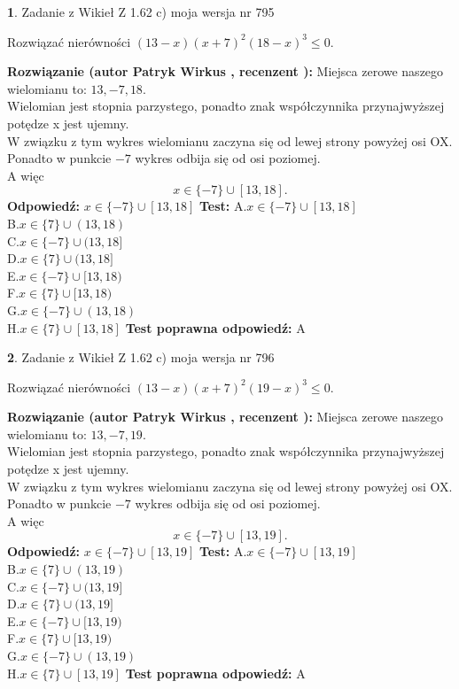 \documentclass[12pt, a4paper]{article}
\theoremstyle{definition} %
\newtheorem{zad}{}
\newcommand{\zadStart}[1]{\begin{zad}#1\newline}
\newcommand{\zadStop}{\end{zad}}
\newcommand{\rozwStart}[2]{\noindent \textbf{Rozwiązanie (autor #1 , recenzent #2): }\newline}
\newcommand{\rozwStop}{\newline}
\newcommand{\odpStart}{\noindent \textbf{Odpowiedź:}\newline}
\newcommand{\odpStop}{\newline}
\newcommand{\testStart}{\noindent \textbf{Test:}\newline}
\newcommand{\testStop}{\newline}
\newcommand{\kluczStart}{\noindent \textbf{Test poprawna odpowiedź:}\newline}
\newcommand{\kluczStop}{\newline}
\begin{document}
\zadStart{Zadanie z Wikieł Z 1.62 c) moja wersja nr 795}

Rozwiązać nierówności $(13-x)(x+7)^{2}(18-x)^{3}\le0$.
\zadStop
\rozwStart{Patryk Wirkus}{}
Miejsca zerowe naszego wielomianu to: $13, -7, 18$.\\
Wielomian jest stopnia parzystego, ponadto znak współczynnika przy\linebreak najwyższej potędze x jest ujemny.\\ W związku z tym wykres wielomianu zaczyna się od lewej strony powyżej osi OX.\\
Ponadto w punkcie $-7$ wykres odbija się od osi poziomej.\\
A więc $$x \in \{-7\} \cup [13,18].$$
\rozwStop
\odpStart
$x \in \{-7\} \cup [13,18]$
\odpStop
\testStart
A.$x \in \{-7\} \cup [13,18]$\\
B.$x \in \{7\} \cup (13,18)$\\
C.$x \in \{-7\} \cup (13,18]$\\
D.$x \in \{7\} \cup (13,18]$\\
E.$x \in \{-7\} \cup [13,18)$\\
F.$x \in \{7\} \cup [13,18)$\\
G.$x \in \{-7\} \cup (13,18)$\\
H.$x \in \{7\} \cup [13,18]$
\testStop
\kluczStart
A
\kluczStop



\zadStart{Zadanie z Wikieł Z 1.62 c) moja wersja nr 796}

Rozwiązać nierówności $(13-x)(x+7)^{2}(19-x)^{3}\le0$.
\zadStop
\rozwStart{Patryk Wirkus}{}
Miejsca zerowe naszego wielomianu to: $13, -7, 19$.\\
Wielomian jest stopnia parzystego, ponadto znak współczynnika przy\linebreak najwyższej potędze x jest ujemny.\\ W związku z tym wykres wielomianu zaczyna się od lewej strony powyżej osi OX.\\
Ponadto w punkcie $-7$ wykres odbija się od osi poziomej.\\
A więc $$x \in \{-7\} \cup [13,19].$$
\rozwStop
\odpStart
$x \in \{-7\} \cup [13,19]$
\odpStop
\testStart
A.$x \in \{-7\} \cup [13,19]$\\
B.$x \in \{7\} \cup (13,19)$\\
C.$x \in \{-7\} \cup (13,19]$\\
D.$x \in \{7\} \cup (13,19]$\\
E.$x \in \{-7\} \cup [13,19)$\\
F.$x \in \{7\} \cup [13,19)$\\
G.$x \in \{-7\} \cup (13,19)$\\
H.$x \in \{7\} \cup [13,19]$
\testStop
\kluczStart
A
\kluczStop
\end{document}
